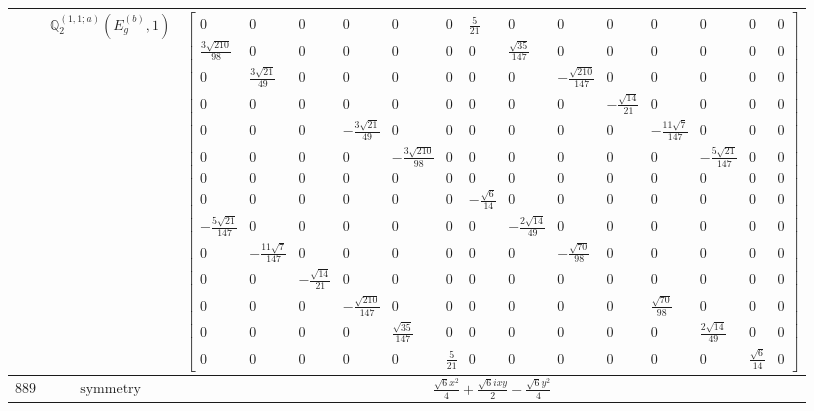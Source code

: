 \documentclass[fleqn,8pt,landscape]{jsarticle}
\begin{document}
\begin{longtable}{ccc}
$  $ & $ \mathbb{Q}_{2}^{(1,1;a)}(E_{g}^{(b)},1) $ & $ \begin{bmatrix} 0 & 0 & 0 & 0 & 0 & 0 & \frac{5}{21} & 0 & 0 & 0 & 0 & 0 & 0 & 0 \\ \frac{3 \sqrt{210}}{98} & 0 & 0 & 0 & 0 & 0 & 0 & \frac{\sqrt{35}}{147} & 0 & 0 & 0 & 0 & 0 & 0 \\ 0 & \frac{3 \sqrt{21}}{49} & 0 & 0 & 0 & 0 & 0 & 0 & - \frac{\sqrt{210}}{147} & 0 & 0 & 0 & 0 & 0 \\ 0 & 0 & 0 & 0 & 0 & 0 & 0 & 0 & 0 & - \frac{\sqrt{14}}{21} & 0 & 0 & 0 & 0 \\ 0 & 0 & 0 & - \frac{3 \sqrt{21}}{49} & 0 & 0 & 0 & 0 & 0 & 0 & - \frac{11 \sqrt{7}}{147} & 0 & 0 & 0 \\ 0 & 0 & 0 & 0 & - \frac{3 \sqrt{210}}{98} & 0 & 0 & 0 & 0 & 0 & 0 & - \frac{5 \sqrt{21}}{147} & 0 & 0 \\ 0 & 0 & 0 & 0 & 0 & 0 & 0 & 0 & 0 & 0 & 0 & 0 & 0 & 0 \\ 0 & 0 & 0 & 0 & 0 & 0 & - \frac{\sqrt{6}}{14} & 0 & 0 & 0 & 0 & 0 & 0 & 0 \\ - \frac{5 \sqrt{21}}{147} & 0 & 0 & 0 & 0 & 0 & 0 & - \frac{2 \sqrt{14}}{49} & 0 & 0 & 0 & 0 & 0 & 0 \\ 0 & - \frac{11 \sqrt{7}}{147} & 0 & 0 & 0 & 0 & 0 & 0 & - \frac{\sqrt{70}}{98} & 0 & 0 & 0 & 0 & 0 \\ 0 & 0 & - \frac{\sqrt{14}}{21} & 0 & 0 & 0 & 0 & 0 & 0 & 0 & 0 & 0 & 0 & 0 \\ 0 & 0 & 0 & - \frac{\sqrt{210}}{147} & 0 & 0 & 0 & 0 & 0 & 0 & \frac{\sqrt{70}}{98} & 0 & 0 & 0 \\ 0 & 0 & 0 & 0 & \frac{\sqrt{35}}{147} & 0 & 0 & 0 & 0 & 0 & 0 & \frac{2 \sqrt{14}}{49} & 0 & 0 \\ 0 & 0 & 0 & 0 & 0 & \frac{5}{21} & 0 & 0 & 0 & 0 & 0 & 0 & \frac{\sqrt{6}}{14} & 0 \end{bmatrix} $ \\ \hline
$ 889 $ & $ \text{symmetry} $ & $ \frac{\sqrt{6} x^{2}}{4} + \frac{\sqrt{6} i x y}{2} - \frac{\sqrt{6} y^{2}}{4} $ \\

\end{longtable}
\end{document}
